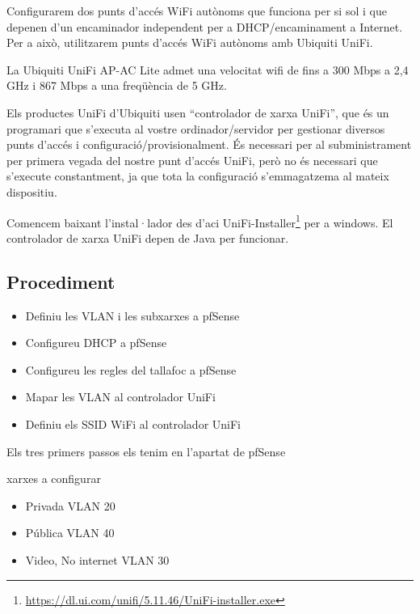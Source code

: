 \documentclass[
  10pt,
]{krantz}
\DeclareRobustCommand{\href}[2]{#2\footnote{\url{#1}}}
\providecommand{\tightlist}{%
  \setlength{\itemsep}{0pt}\setlength{\parskip}{0pt}}
\begin{document}
Configurarem dos punts d'accés WiFi autònoms que funciona per si sol i que depenen d'un encaminador independent per a DHCP/encaminament a Internet. Per a això, utilitzarem punts d'accés WiFi autònoms amb Ubiquiti UniFi.

La Ubiquiti UniFi AP-AC Lite admet una velocitat wifi de fins a 300 Mbps a 2,4 GHz i 867 Mbps a una freqüència de 5 GHz.

Els productes UniFi d'Ubiquiti usen ``controlador de xarxa UniFi'', que és un programari que s'executa al vostre ordinador/servidor per gestionar diversos punts d'accés i configuració/provisionalment. És necessari per al subministrament per primera vegada del nostre punt d'accés UniFi, però no és necessari que s'execute constantment, ja que tota la configuració s'emmagatzema al mateix dispositiu.

Comencem baixant l'instal·lador des d'aci \href{https://dl.ui.com/unifi/5.11.46/UniFi-installer.exe}{UniFi-Installer} per a windows. El controlador de xarxa UniFi depen de Java per funcionar.

\hypertarget{procediment-1}{%
\subsection{Procediment}\label{procediment-1}}

\begin{itemize}
\tightlist
\item
  Definiu les VLAN i les subxarxes a pfSense
\item
  Configureu DHCP a pfSense
\item
  Configureu les regles del tallafoc a pfSense
\item
  Mapar les VLAN al controlador UniFi
\item
  Definiu els SSID WiFi al controlador UniFi
\end{itemize}

\begin{rmdinfo}{}
Els tres primers passos els tenim en l'apartat de pfSense

\end{rmdinfo}

xarxes a configurar

\begin{itemize}
\tightlist
\item
  Privada VLAN 20
\item
  Pública VLAN 40
\item
  Video, No internet VLAN 30
\end{itemize}
\end{document}
